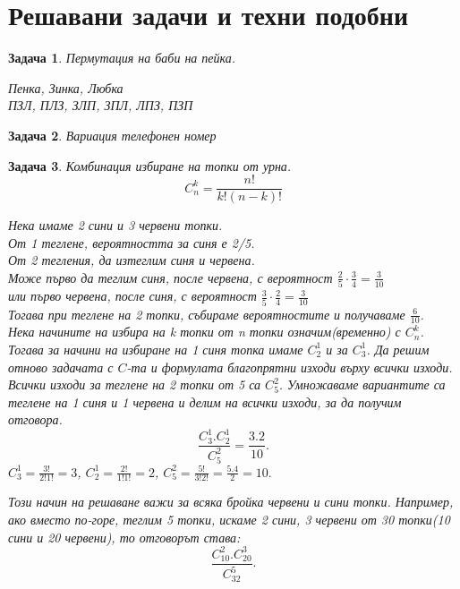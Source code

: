 \documentclass{article}
\newtheorem{problem}{Задача}
\begin{document}
	
	\section{Решавани задачи и техни подобни}
	
	\begin{problem}
	Пермутация на баби на пейка. 

	Пенка, Зинка, Любка \\
	ПЗЛ, ПЛЗ, ЗЛП, ЗПЛ, ЛПЗ, ПЗП \\


	\end{problem}	
	
	
	\begin{problem}
		Вариация телефонен номер
	\end{problem}
	
		\begin{problem}
		Комбинация избиране на топки от урна.\\ 
		$$ C_n^k = \frac{n!}{k!(n-k)!}  $$
		
		Нека имаме 2 сини и 3 червени топки.\\
		От 1 теглене, вероятността за синя е 2/5.\\
		От 2 тегления, да изтеглим синя и червена. \\
		
		Може първо да теглим синя, после червена, с  вероятност $\frac{2}{5} \cdot \frac{3}{4} = \frac{3}{10}$  \\
		или първо червена, после синя, с вероятност  $ \frac{3}{5} \cdot \frac{2}{4} = \frac{3}{10}$  \\
		Тогава при теглене на 2 топки, събираме вероятностите и получаваме
		$\frac{6}{10}$.\\
		Нека начините на избира на k топки от n топки означим(временно) с $C^k_n $. Тогава за начини на избиране на 1 синя топка имаме $C_2^1 $ и за $C_3^1 $. Да решим отново задачата с $C$-та и формулата благопрятни изходи върху всички изходи.
		Всички изходи за теглене на 2 топки от 5 са $C_5^2$. Умножаваме вариантите са теглене на 1 синя и 1 червена и делим на всички изходи, за да получим отговора. \\
		$$\frac{C^1_3 . C^1_2}{C_5^2} = \frac{3.2}{10} .$$
		$C_3^1 = \frac{3!}{2!1!} = 3 $, $C_2^1 = \frac{2!}{1!1!} = 2 $,  $C_5^2 = \frac{5!}{3!2!} = \frac{5.4}{2} = 10.$
		
		
		Този начин на решаване важи за всяка бройка червени и сини топки. Например, ако вместо по-горе, теглим 5 топки, искаме 2 сини, 3 червени от 30 топки(10 сини и 20 червени), то отговорът става:\\
		$$ \frac{C_{10}^2 . C_{20}^3}{C_{32}^5}. $$\\
		
	\end{problem}
\end{document}
